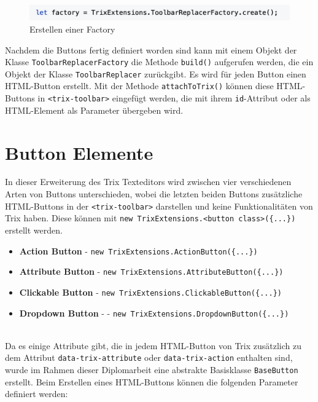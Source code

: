 \begin{figure}[H]
\begin{center}
	\includegraphics[scale=.7]{images/toolbar_replacer_factory.png}
\end{center}
	\caption{Erstellen einer Factory} 
\end{figure}

Nachdem die Buttons fertig definiert worden sind kann mit einem Objekt der Klasse \texttt{ToolbarReplacerFactory} 
die Methode \texttt{build()} aufgerufen werden, die ein Objekt der Klasse \texttt{ToolbarReplacer} zurückgibt. Es wird  
für jeden Button einen HTML-Button erstellt. Mit der Methode \texttt{attachToTrix()} können diese HTML-Buttons in  
\texttt{<trix-toolbar>} eingefügt werden, die mit ihrem \texttt{id}-Attribut oder als HTML-Element als Parameter 
übergeben wird.

\section{Button Elemente}
\label{subsec:buttons}
In dieser Erweiterung des Trix Texteditors wird zwischen vier verschiedenen Arten von Buttons unterschieden, wobei 
die  letzten beiden Buttons zusätzliche HTML-Buttons in der \texttt{<trix-toolbar>} darstellen und keine 
Funktionalitäten 
von Trix haben. Diese können mit \texttt{new TrixExtensions.<button class>(\{...\})} erstellt werden.

\begin{itemize}
	\item{\textbf{Action Button}} - \texttt{new TrixExtensions.ActionButton(\{...\})}
	\item{\textbf{Attribute Button}} - \texttt{new TrixExtensions.AttributeButton(\{...\})}
	\item{\textbf{Clickable Button}} - \texttt{new TrixExtensions.ClickableButton(\{...\})}
	\item{\textbf{Dropdown Button}} - - \texttt{new TrixExtensions.DropdownButton(\{...\})}
\end{itemize}

\mbox{}\\
Da es einige Attribute gibt, die in jedem HTML-Button von Trix zusätzlich zu dem Attribut \texttt{data-trix-attribute} 
oder 
\texttt{data-trix-action} enthalten sind, wurde im Rahmen dieser Diplomarbeit eine abstrakte Basisklasse 
\texttt{BaseButton} 
erstellt. Beim Erstellen eines HTML-Buttons können die folgenden Parameter definiert werden:

